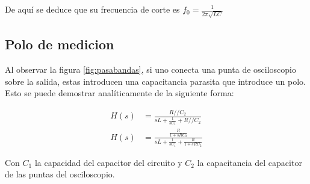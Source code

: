De aquí se deduce que su frecuencia de corte es $f_0 = \frac{1}{2\pi \sqrt{LC}}$

\subsection{Polo de medicion}
\label{subsec:eqpolo}
Al observar la figura \ref{fig:pasabandas}, si uno conecta una punta de osciloscopio sobre la salida, estas introducen una capacitancia parasita que introduce un polo. Esto se puede demostrar analíticamente de la siguiente forma:

\begin{align*}
H(s) &= \frac{R//C_2}{sL + \frac{1}{sC_1} + R//C_2}\\
H(s) &= \frac{\frac{R}{1+sRC_2}}{sL + \frac{1}{sC_1} + \frac{R}{1+sRC_2}}
\end{align*}

Con $C_1$ la capacidad del capacitor del circuito y $C_2$ la capacitancia del capacitor de las puntas del osciloscopio.\par

